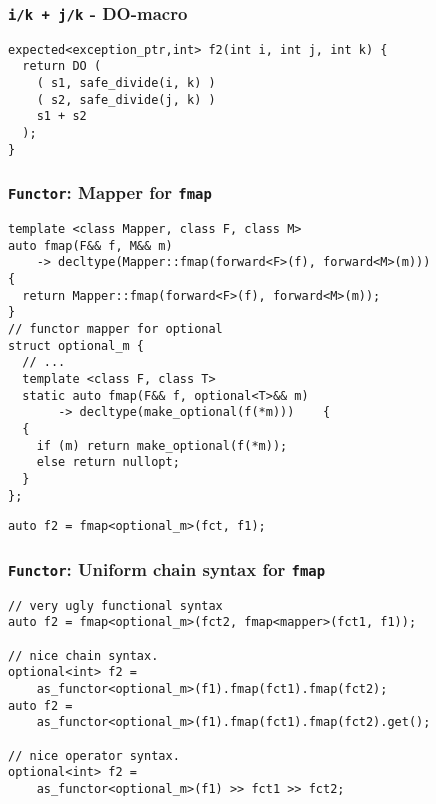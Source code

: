 \documentclass[xcolor=dvipsnames]{beamer}
\newcommand{\cpp}[1]{\lstinline{#1}}
\begin{document}
\begin{frame}[fragile]
\frametitle{\cpp{i/k + j/k}  - DO-macro}

\begin{lstlisting}
expected<exception_ptr,int> f2(int i, int j, int k) {
  return DO (
    ( s1, safe_divide(i, k) )
    ( s2, safe_divide(j, k) )
    s1 + s2 
  );
}
\end{lstlisting}

\end{frame}





\begin{frame}[fragile]
\frametitle{\cpp{Functor}: Mapper for \cpp{fmap}}

\begin{lstlisting}
template <class Mapper, class F, class M>
auto fmap(F&& f, M&& m)
    -> decltype(Mapper::fmap(forward<F>(f), forward<M>(m)))
{
  return Mapper::fmap(forward<F>(f), forward<M>(m));
}
// functor mapper for optional
struct optional_m {
  // ...
  template <class F, class T>
  static auto fmap(F&& f, optional<T>&& m) 
       -> decltype(make_optional(f(*m)))    {
  {
    if (m) return make_optional(f(*m));
    else return nullopt;
  }
};
\end{lstlisting}

\begin{lstlisting}
auto f2 = fmap<optional_m>(fct, f1); 
\end{lstlisting}

\end{frame}
\begin{frame}[fragile]
\frametitle{\cpp{Functor}: Uniform chain syntax for \cpp{fmap}}

\begin{lstlisting}
// very ugly functional syntax
auto f2 = fmap<optional_m>(fct2, fmap<mapper>(fct1, f1)); 

// nice chain syntax. 
optional<int> f2 = 
    as_functor<optional_m>(f1).fmap(fct1).fmap(fct2); 
auto f2 = 
    as_functor<optional_m>(f1).fmap(fct1).fmap(fct2).get();

// nice operator syntax.  
optional<int> f2 = 
    as_functor<optional_m>(f1) >> fct1 >> fct2;  
\end{lstlisting}

\end{frame}
\end{document}
